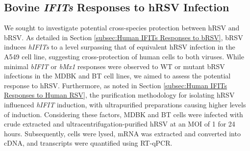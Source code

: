 \subsection{Bovine \textit{IFITs} Responses to hRSV Infection} \label{subsec:Bovine IFITs Responses to hRSV Infection}
We sought to investigate potential cross-species protection between hRSV and bRSV. As detailed in Section \ref{subsec:Human IFITs Responses to bRSV}, bRSV induces \textit{hIFITs} to a level surpassing that of equivalent hRSV infection in the A549 cell line, suggesting cross-protection of human cells to both viruses. While minimal \textit{bIFIT} or \textit{bMx1} responses were observed to WT or mutant bRSV infections in the MDBK and BT cell lines, we aimed to assess the potential response to hRSV. Furthermore, as noted in Section \ref{subsec:Human IFITs Responses to Human RSV}, the purification methodology for isolating hRSV influenced \textit{hIFIT} induction, with ultrapurified preparations causing higher levels of induction. Considering these factors, MDBK and BT cells were infected with crude extracted and ultracentrifugation-purified hRSV at an MOI of 1 for 24 hours. Subsequently, cells were lysed, mRNA was extracted and converted into cDNA, and transcripts were quantified using RT-qPCR.

